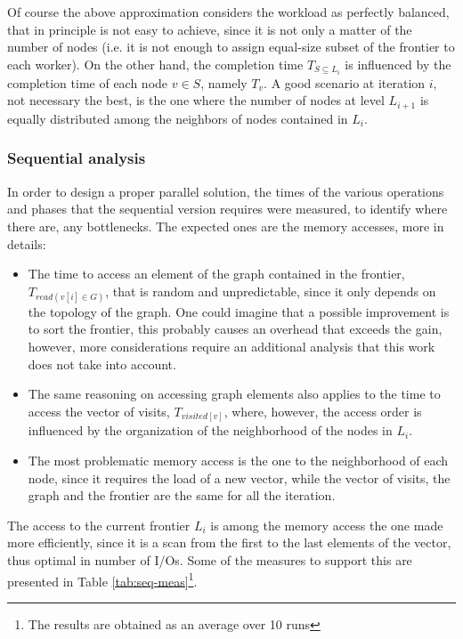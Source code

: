 Of course the above approximation considers the workload as perfectly balanced,
that in principle is not easy to achieve, since it is not only
a matter of the number of nodes (i.e. it is not enough to assign equal-size
subset of the frontier to each worker). On the other hand, the completion time $T_{S \subseteq L_i}$
is influenced by the completion time of each node $v \in S$, namely $T_v$. A good scenario at iteration $i$, not necessary the best,
is the one where the number of nodes at level $L_{i+1}$ is equally
distributed among the neighbors of nodes contained in $L_i$.
\subsubsection{Sequential analysis}
In order to design a proper parallel solution, 
the times of the various operations and phases that the sequential
 version requires were measured, to identify where there are, any bottlenecks.
The expected ones are the memory accesses, more in details:
\begin{itemize}
    \item The time to access an element of the graph contained in the frontier,
    $T_{read(v[i]\in G)}$, that is 
    random and unpredictable, since it only depends on the topology of the graph. One could
    imagine that a possible improvement is to sort the frontier, this probably causes
    an overhead that exceeds the gain, however, more 
    considerations require an additional 
    analysis that this work does not take into account.
    \item The same reasoning on accessing graph elements
     also applies to the time to access the vector of visits, $T_{visited[v]}$, where, however, 
    the access order is influenced by the organization of the neighborhood 
    of the nodes in $L_i$.
    \item The most problematic memory access is the one to the neighborhood of each node, since it
    requires the load of a new vector, while the vector of visits, the graph and the frontier are
     the same
    for all the iteration.
\end{itemize}
The access to the current frontier $L_i$ is among the memory access 
the one made more efficiently, since it is a scan from the 
first to the last elements
of the vector, thus optimal in number of I/Os. Some of
 the measures to support this are presented in Table \ref{tab:seq-meas}\footnote{The results are obtained as an average over 10 runs}.

